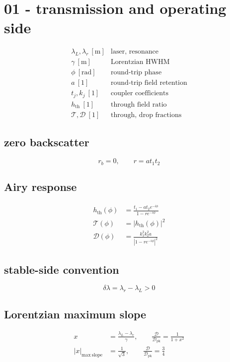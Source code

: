 \section*{01 - transmission and operating side}

\[
\begin{array}{ll}\lambda_L,\lambda_r\ [\mathrm m]&\text{laser, resonance}\\[0.6em]\gamma\ [\mathrm m]&\text{Lorentzian HWHM}\\[0.6em]\phi\ [\mathrm{rad}]&\text{round-trip phase}\\[0.6em]a\ [1]&\text{round-trip field retention}\\[0.6em]t_j,k_j\ [1]&\text{coupler coefficients}\\[0.6em]h_{\mathrm{th}}\ [1]&\text{through field ratio}\\[0.6em]\mathcal T,\mathcal D\ [1]&\text{through, drop fractions}\end{array}
\]

\subsection*{zero backscatter}
\[
\displaystyle r_b=0,\qquad r=a t_1t_2
\]

\subsection*{Airy response}
\[
\displaystyle \begin{aligned}h_{\mathrm{th}}(\phi)&=\frac{t_1-a t_2e^{-i\phi}}{1-r e^{-i\phi}}\\\mathcal T(\phi)&=|h_{\mathrm{th}}(\phi)|^2\\\mathcal D(\phi)&=\frac{k_1^2k_2^2a}{|1-r e^{-i\phi}|^2}\end{aligned}
\]

\subsection*{stable-side convention}
\[
\displaystyle \delta\lambda=\lambda_r-\lambda_L>0
\]

\subsection*{Lorentzian maximum slope}
\[
\displaystyle \begin{aligned}x&=\frac{\lambda_L-\lambda_r}{\gamma},\qquad\frac{\mathcal D}{\mathcal D_{\mathrm{pk}}}=\frac1{1+x^2}\\|x|_{\mathrm{max\ slope}}&=\frac1{\sqrt3},\qquad\frac{\mathcal D}{\mathcal D_{\mathrm{pk}}}=\frac34\end{aligned}
\]
